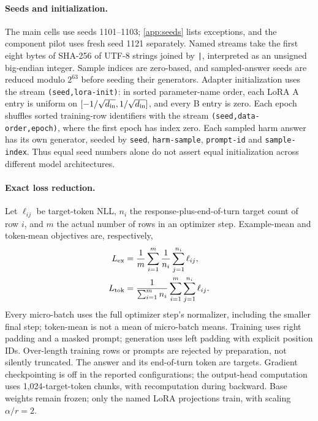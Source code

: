 \documentclass{article}
\begin{document}
\paragraph{Seeds and initialization.} The main cells use seeds 1101--1103;
\cref{app:seeds} lists exceptions, and the component pilot uses fresh seed
1121 separately. Named streams take the first eight bytes of SHA-256 of
UTF-8 strings joined by \texttt{|}, interpreted as an unsigned big-endian
integer. Sample indices are zero-based, and sampled-answer seeds are reduced
modulo $2^{63}$ before seeding their generators. Adapter initialization uses the stream \texttt{(seed,lora-init)}:
in sorted parameter-name order, each LoRA A entry is uniform on
$[-1/\sqrt{d_{\rm in}},1/\sqrt{d_{\rm in}}]$, and every B entry is zero.
Each epoch shuffles sorted training-row identifiers with the stream
\texttt{(seed,data-order,epoch)}, where the first epoch has index zero.
Each sampled harm answer has its own generator, seeded by
\texttt{seed}, \texttt{harm-sample}, \texttt{prompt-id} and
\texttt{sample-index}. Thus equal seed numbers
alone do not assert equal initialization across different model architectures.

\paragraph{Exact loss reduction.} Let $\ell_{ij}$ be target-token NLL,
$n_i$ the response-plus-end-of-turn target count of row $i$, and $m$ the
actual number of rows in an optimizer step. Example-mean and token-mean
objectives are, respectively,
\begin{align}
 L_{\rm ex}&=\frac{1}{m}\sum_{i=1}^{m}
                  \frac{1}{n_i}\sum_{j=1}^{n_i}\ell_{ij},\\
 L_{\rm tok}&=\frac{1}{\sum_{i=1}^{m}n_i}
                  \sum_{i=1}^{m}\sum_{j=1}^{n_i}\ell_{ij}.
\end{align}
Every micro-batch uses the full optimizer step's normalizer, including the
smaller final step; token-mean is not a mean of micro-batch means. Training
uses right padding and a masked prompt; generation uses left padding with
explicit position IDs. Over-length training rows or prompts are rejected
by preparation, not silently truncated. The answer and its end-of-turn token
are targets. Gradient checkpointing is off in the reported configurations;
the output-head computation uses 1,024-target-token chunks, with recomputation
during backward. Base weights remain frozen; only the named LoRA projections
train, with scaling $\alpha/r=2$.
\end{document}
